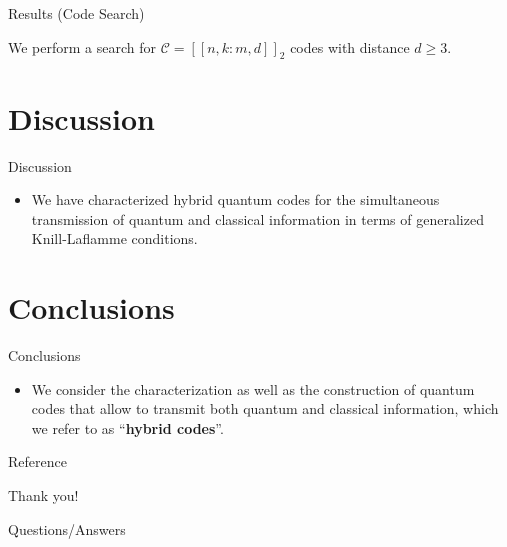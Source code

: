 \documentclass[ignorenonframetext,]{beamer}
\newif\ifbibliography
\providecommand{\tightlist}{%
  \setlength{\itemsep}{0pt}\setlength{\parskip}{0pt}}
\begin{document}
\begin{frame}{Results (Code Search)}

We perform a search for \(\mathcal{C}=[\![n,k{:}m,d]\!]_2\) codes with
distance \(d\ge 3\).

\end{frame}

\section{Discussion}\label{discussion}

\begin{frame}{Discussion}

\begin{itemize}
\tightlist
\item
  We have characterized hybrid quantum codes for the simultaneous
  transmission of quantum and classical information in terms of
  generalized Knill-Laflamme conditions.
\end{itemize}

\end{frame}

\section{Conclusions}\label{conclusions}

\begin{frame}{Conclusions}

\begin{itemize}
\tightlist
\item
  We consider the characterization as well as the construction of
  quantum codes that allow to transmit both quantum and classical
  information, which we refer to as ``\textbf{hybrid codes}''.
\end{itemize}

\end{frame}

\renewcommand\refname{Reference}
\begin{frame}[allowframebreaks]{Reference}
\bibliographytrue

\end{frame}


\begin{frame}
\begin{center}
\Huge{{Thank you!}}
\end{center}
\end{frame}
\begin{frame}
\begin{center}
\Huge{{Questions/Answers}}
\end{center}
\end{frame}
\end{document}
